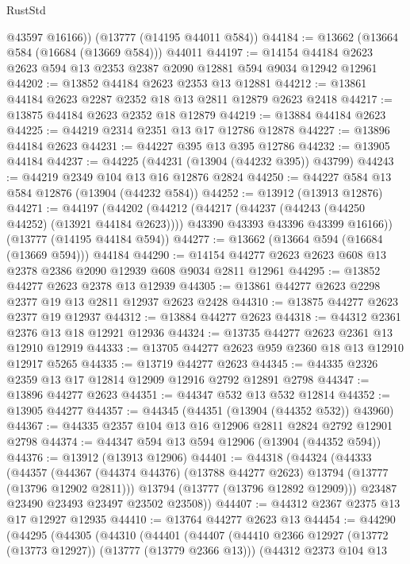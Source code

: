 \begin{lexlean}{RustStd}
\begin{coremodule}
        @43597
        @16166))
    (@13777 (@14195 @44011 @584))
@44184 := @13662 (@13664 @584 (@16684 (@13669 @584))) @44011
@44197 := @14154 @44184 @2623 @2623 @594 @13 @2353 @2387 @2090 @12881 @594 @9034 @12942 @12961
@44202 := @13852 @44184 @2623 @2353 @13 @12881
@44212 := @13861 @44184 @2623 @2287 @2352 @18 @13 @2811 @12879 @2623 @2418
@44217 := @13875 @44184 @2623 @2352 @18 @12879
@44219 := @13884 @44184 @2623
@44225 := @44219 @2314 @2351 @13 @17 @12786 @12878
@44227 := @13896 @44184 @2623
@44231 := @44227 @395 @13 @395 @12786
@44232 := @13905 @44184
@44237 := @44225 (@44231 (@13904 (@44232 @395)) @43799)
@44243 := @44219 @2349 @104 @13 @16 @12876 @2824
@44250 := @44227 @584 @13 @584 @12876 (@13904 (@44232 @584))
@44252 := @13912 (@13913 @12876)
@44271 := @44197
    (@44202
      (@44212
        (@44217 (@44237 (@44243 (@44250 @44252) (@13921 @44184 @2623))))
        @43390
        @43393
        @43396
        @43399
        @16166))
    (@13777 (@14195 @44184 @594))
@44277 := @13662 (@13664 @594 (@16684 (@13669 @594))) @44184
@44290 := @14154 @44277 @2623 @2623 @608 @13 @2378 @2386 @2090 @12939 @608 @9034 @2811 @12961
@44295 := @13852 @44277 @2623 @2378 @13 @12939
@44305 := @13861 @44277 @2623 @2298 @2377 @19 @13 @2811 @12937 @2623 @2428
@44310 := @13875 @44277 @2623 @2377 @19 @12937
@44312 := @13884 @44277 @2623
@44318 := @44312 @2361 @2376 @13 @18 @12921 @12936
@44324 := @13735 @44277 @2623 @2361 @13 @12910 @12919
@44333 := @13705 @44277 @2623 @959 @2360 @18 @13 @12910 @12917 @5265
@44335 := @13719 @44277 @2623
@44345 := @44335 @2326 @2359 @13 @17 @12814 @12909 @12916 @2792 @12891 @2798
@44347 := @13896 @44277 @2623
@44351 := @44347 @532 @13 @532 @12814
@44352 := @13905 @44277
@44357 := @44345 (@44351 (@13904 (@44352 @532)) @43960)
@44367 := @44335 @2357 @104 @13 @16 @12906 @2811 @2824 @2792 @12901 @2798
@44374 := @44347 @594 @13 @594 @12906 (@13904 (@44352 @594))
@44376 := @13912 (@13913 @12906)
@44401 := @44318
    (@44324
      (@44333
        (@44357
          (@44367 (@44374 @44376) (@13788 @44277 @2623) @13794 (@13777 (@13796 @12902 @2811)))
          @13794
          (@13777 (@13796 @12892 @12909)))
        @23487
        @23490
        @23493
        @23497
        @23502
        @23508))
@44407 := @44312 @2367 @2375 @13 @17 @12927 @12935
@44410 := @13764 @44277 @2623 @13
@44454 := @44290
    (@44295
      (@44305
        (@44310
          (@44401
            (@44407
              (@44410 @2366 @12927 (@13772 (@13773 @12927)) (@13777 (@13779 @2366 @13)))
              (@44312
                @2373
                @104
                @13

\end{coremodule}
\end{lexlean}

